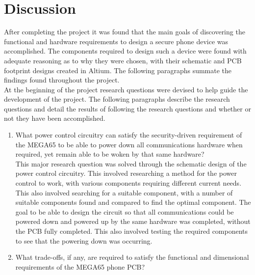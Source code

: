 
\chapter{Discussion} %

\label{Chapter7} %


	After completing the project it was found that the main goals of discovering the functional and hardware requirements to design a secure phone device was accomplished. The components required to design such a device were found with adequate reasoning as to why they were chosen, with their schematic and PCB footprint designs created in Altium. The following paragraphs summate the findings found throughout the project.\\

	At the beginning of the project research questions were devised to help guide the development of the project. The following paragraphs describe the research questions and detail the results of following the research questions and whether or not they have been accomplished.\\

\begin{enumerate}
\item What power control circuitry can satisfy the security-driven requirement of the MEGA65 to be able to power down all communications hardware when required, yet remain able to be woken by that same hardware?\\

	This major research question was solved through the schematic design of the power control circuitry. This involved researching a method for the power control to work, with various components requiring different current needs. This also involved searching for a suitable component, with a number of suitable components found and compared to find the optimal component. The goal to be able to design the circuit so that all communications could be powered down and powered up by the same hardware was completed, without the PCB fully completed. This also involved testing the required components to see that the powering down was occurring.
	
\item What trade-offs, if any, are required to satisfy the functional and dimensional requirements of the MEGA65 phone PCB?
\end{enumerate}

